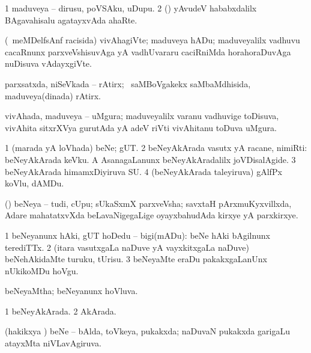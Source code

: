 {{\bentry
{} 
\gl{\nA}
\expl{}
\bmng
\bnum
\num{1} maduveya -- dirusu, poVSAku, uDupu. 
\num{2} (\rUpa) yAvudeV hababxdalilx BAgavahisalu agatayxvAda ahaRte. 
\enum
\emng
\eentry

\bentry
{} 
\gl{\nA}
\expl{}
\bmng
(\kanmu\ meMDelfsAnf racisida) vivAhagiVte; maduveya hADu; maduveyalilx vadhuvu cacaRnunx parxveVshisuvAga yA vadhUvararu caciRniMda horahoraDuvAga nuDisuva vAdayxgiVte. 
\emng
\eentry

\bentry
{} 
\gl{\nA}
\expl{}
\bmng
parxsatxda, niSeVkada -- rAtirx; \kanmu\ saMBoVgakekx saMbaMdhisida, maduveya(dinada) rAtirx. 
\emng
\eentry

\bentry
{} 
\gl{\nA}
\expl{}
\bmng
vivAhada, maduveya -- uMgura; maduveyalilx varanu vadhuvige toDisuva, vivAhita sitxrXVya gurutAda yA adeV riVti vivAhitanu toDuva uMgura. 
\emng
\eentry

\bentry
{} 
\gl{\nA}
\expl{}
\bmng
\bnum
\num{1} (marada yA loVhada) beNe; gUT. 
\num{2} beNeyAkArada vasutx yA racane, nimiRti:  beNeyAkArada keVku.  A AsanagaLanunx beNeyAkAradalilx joVDisalAgide. 
\num{3} beNeyAkArada himamxDiyiruva SU. 
\num{4} (beNeyAkArada taleyiruva) gAlfPx koVlu, dAMDu. 
\enum
\emng

\noindent 
\gl{\pagu}
\expl{}
\bmng
{}  (\AmA) beNeya -- tudi, cUpu; sUkaSxmX parxveVsha; savxtaH pArxmuKyxvillxda, Adare mahatatxvXda beLavaNigegaLige oyayxbahudAda kirxye yA parxkirxye. 
\emng
\eentry

\bentry
{} 
\gl{\sakirx}
\expl{}
\bmng
\bnum
\num{1} beNeyanunx hAki, gUT hoDedu -- bigi(mADu):  beNe hAki bAgilnunx terediTTx. 
\num{2} (itara vasutxgaLa naDuve yA vayxkitxgaLa naDuve) beNehAkidaMte turuku, tUrisu. 
\num{3} beNeyaMte eraDu pakakxgaLanUnx nUkikoMDu hoVgu. 
\enum
\emng
\eentry

\bentry
{} 
\gl{\gu}
\expl{}
\bmng
beNeyaMtha; beNeyanunx hoVluva. 
\emng
\eentry

\bentry
{} 
\gl{\gu}
\expl{}
\bmng
\bnum
\num{1} beNeyAkArada. 
\num{2}  AkArada. 
\enum
\emng
\eentry

\bentry
{} 
\gl{\gu}
\expl{}
\bmng
(hakikxya \vi) beNe -- bAlda, toVkeya, pukakxda; naDuvaN pukakxda garigaLu atayxMta niVLavAgiruva. 
\emng
\eentry

}}
